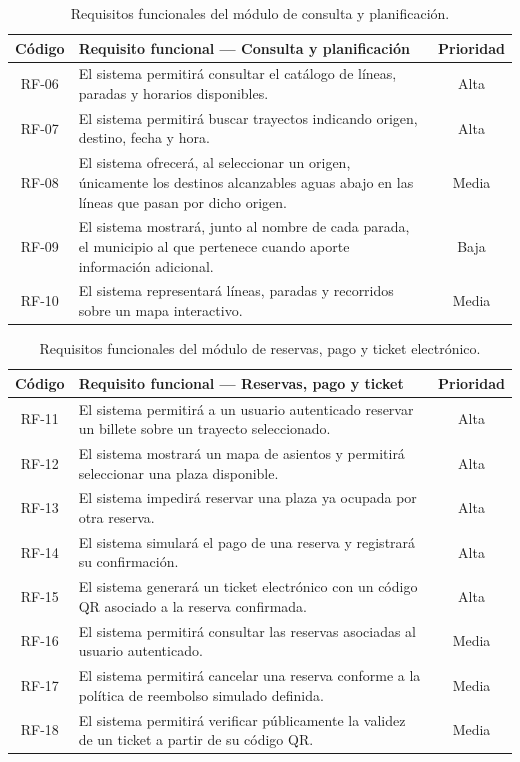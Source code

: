\begin{table}[h!]
\centering
\small
\begin{tabular}{|c|p{10.5cm}|c|}
\hline
\textbf{Código} & \textbf{Requisito funcional --- Consulta y planificación} & \textbf{Prioridad} \\ \hline
RF-06 & El sistema permitirá consultar el catálogo de líneas, paradas y horarios disponibles. & Alta \\ \hline
RF-07 & El sistema permitirá buscar trayectos indicando origen, destino, fecha y hora. & Alta \\ \hline
RF-08 & El sistema ofrecerá, al seleccionar un origen, únicamente los destinos alcanzables aguas abajo en las líneas que pasan por dicho origen. & Media \\ \hline
RF-09 & El sistema mostrará, junto al nombre de cada parada, el municipio al que pertenece cuando aporte información adicional. & Baja \\ \hline
RF-10 & El sistema representará líneas, paradas y recorridos sobre un mapa interactivo. & Media \\ \hline
\end{tabular}
\caption{Requisitos funcionales del módulo de consulta y planificación.}
\label{tab:rf-consulta}
\end{table}

\begin{table}[h!]
\centering
\small
\begin{tabular}{|c|p{10.5cm}|c|}
\hline
\textbf{Código} & \textbf{Requisito funcional --- Reservas, pago y ticket} & \textbf{Prioridad} \\ \hline
RF-11 & El sistema permitirá a un usuario autenticado reservar un billete sobre un trayecto seleccionado. & Alta \\ \hline
RF-12 & El sistema mostrará un mapa de asientos y permitirá seleccionar una plaza disponible. & Alta \\ \hline
RF-13 & El sistema impedirá reservar una plaza ya ocupada por otra reserva. & Alta \\ \hline
RF-14 & El sistema simulará el pago de una reserva y registrará su confirmación. & Alta \\ \hline
RF-15 & El sistema generará un ticket electrónico con un código QR asociado a la reserva confirmada. & Alta \\ \hline
RF-16 & El sistema permitirá consultar las reservas asociadas al usuario autenticado. & Media \\ \hline
RF-17 & El sistema permitirá cancelar una reserva conforme a la política de reembolso simulado definida. & Media \\ \hline
RF-18 & El sistema permitirá verificar públicamente la validez de un ticket a partir de su código QR. & Media \\ \hline
\end{tabular}
\caption{Requisitos funcionales del módulo de reservas, pago y ticket electrónico.}
\label{tab:rf-reservas}
\end{table}

